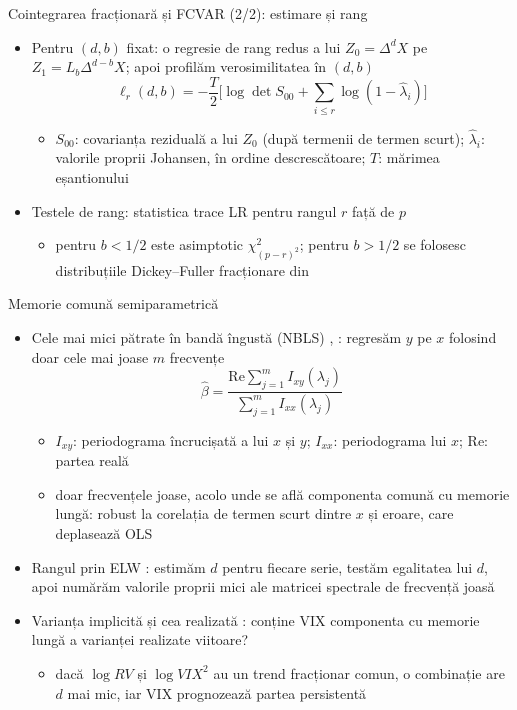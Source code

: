 \begin{frame}{Cointegrarea fracționară și FCVAR (2/2): estimare și rang}
\itemsize{\small}
\begin{itemize}
    \item Pentru $(d, b)$ fixat: o regresie de rang redus a lui $Z_0 = \Delta^dX$ pe $Z_1 = L_b\Delta^{d-b}X$; apoi profilăm verosimilitatea în $(d, b)$
    \[ \ell_r(d, b) = -\frac T2\Big[\log\det S_{00} + \sum_{i\le r}\log(1 - \hat\lambda_i)\Big] \]
    \begin{itemize}
        \item $S_{00}$: covarianța reziduală a lui $Z_0$ (după termenii de termen scurt); $\hat\lambda_i$: valorile proprii Johansen, în ordine descrescătoare; $T$: mărimea eșantionului
    \end{itemize}
    \item Testele de rang: statistica trace LR pentru rangul $r$ față de $p$
    \begin{itemize}
        \item pentru $b < 1/2$ este asimptotic $\chi^2_{(p-r)^2}$; pentru $b > 1/2$ se folosesc distribuțiile Dickey--Fuller fracționare din 
    \end{itemize}
\end{itemize}
\end{frame}

\begin{frame}{Memorie comună semiparametrică}
\itemsize{\small}
\begin{itemize}
    \item Cele mai mici pătrate în bandă îngustă (NBLS) , : regresăm $y$ pe $x$ folosind doar cele mai joase $m$ frecvențe
    \[ \hat\beta = \frac{\mathrm{Re}\sum_{j=1}^mI_{xy}(\lambda_j)}{\sum_{j=1}^mI_{xx}(\lambda_j)} \]
    \begin{itemize}
        \item $I_{xy}$: periodograma încrucișată a lui $x$ și $y$; $I_{xx}$: periodograma lui $x$; $\mathrm{Re}$: partea reală
        \item doar frecvențele joase, acolo unde se află componenta comună cu memorie lungă: robust la corelația de termen scurt dintre $x$ și eroare, care deplasează OLS
    \end{itemize}
    \item Rangul prin ELW : estimăm $d$ pentru fiecare serie, testăm egalitatea lui $d$, apoi numărăm valorile proprii mici ale matricei spectrale de frecvență joasă
    \item Varianța implicită și cea realizată : conține VIX componenta cu memorie lungă a varianței realizate viitoare?
    \begin{itemize}
        \item dacă $\log RV$ și $\log VIX^2$ au un trend fracționar comun, o combinație are $d$ mai mic, iar VIX prognozează partea persistentă
    \end{itemize}
\end{itemize}
\end{frame}

